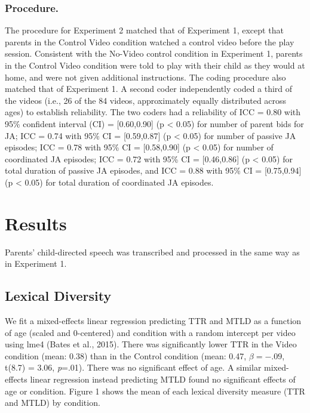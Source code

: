 \documentclass[10pt, letterpaper]{article}
\begin{document}
\subsubsection{Procedure.}\label{procedure.-1}

The procedure for Experiment 2 matched that of Experiment 1, except that
parents in the Control Video condition watched a control video before
the play session. Consistent with the No-Video control condition in
Experiment 1, parents in the Control Video condition were told to play
with their child as they would at home, and were not given additional
instructions. The coding procedure also matched that of Experiment 1. A
second coder independently coded a third of the videos (i.e., 26 of the
84 videos, approximately equally distributed across ages) to establish
reliability. The two coders had a reliability of ICC = 0.80 with 95\%
confident interval (CI) = {[}0.60,0.90{]} (p \textless{} 0.05) for
number of parent bids for JA; ICC = 0.74 with 95\% CI = {[}0.59,0.87{]}
(p \textless{} 0.05) for number of passive JA episodes; ICC = 0.78 with
95\% CI = {[}0.58,0.90{]} (p \textless{} 0.05) for number of coordinated
JA episodes; ICC = 0.72 with 95\% CI = {[}0.46,0.86{]} (p \textless{}
0.05) for total duration of passive JA episodes, and ICC = 0.88 with
95\% CI = {[}0.75,0.94{]} (p \textless{} 0.05) for total duration of
coordinated JA episodes.

\section{Results}\label{results-1}

Parents' child-directed speech was transcribed and processed in the same
way as in Experiment 1.

\subsection{Lexical Diversity}\label{lexical-diversity-1}

We fit a mixed-effects linear regression predicting TTR and MTLD as a
function of age (scaled and 0-centered) and condition with a random
intercept per video using lme4 (Bates et al., 2015). There was
significantly lower TTR in the Video condition (mean: 0.38) than in the
Control condition (mean: 0.47, \(\beta=-.09\), t(8.7) = 3.06,
\emph{p}=.01). There was no significant effect of age. A similar
mixed-effects linear regression instead predicting MTLD found no
significant effects of age or condition. Figure 1 shows the mean of each
lexical diversity measure (TTR and MTLD) by condition.
\end{document}
